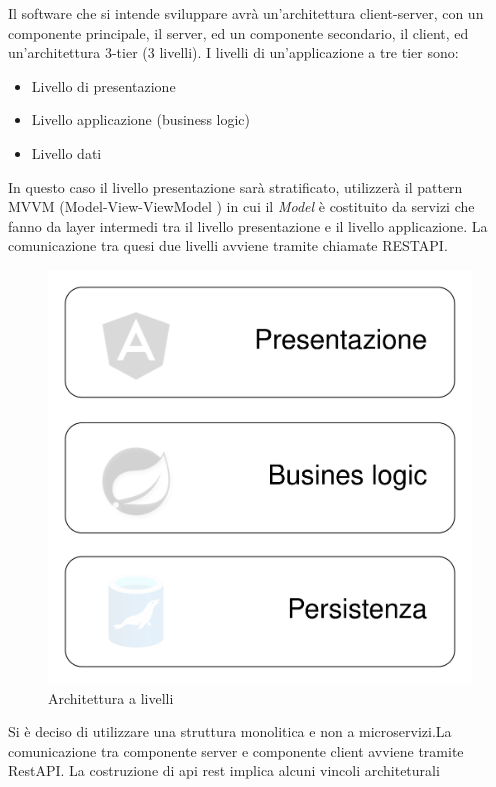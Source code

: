 \documentclass[a4paper,11pt]{article}
\begin{document}
Il software che si intende sviluppare avrà un'architettura client-server, con un componente principale, il server, ed un componente secondario, il client, ed un'architettura 3-tier (3 livelli). I livelli di un'applicazione a tre tier sono:
\begin{itemize}
  \item Livello di presentazione
  \item Livello applicazione (business logic)
  \item Livello dati
\end{itemize}

In questo caso il livello presentazione sarà stratificato, utilizzerà il pattern MVVM (Model-View-ViewModel \cite{wikipediaModelviewviewmodelWikipedia}) in cui il \textit{Model} è costituito da servizi che fanno da layer intermedi tra il livello presentazione e il livello applicazione. La comunicazione tra quesi due livelli avviene tramite chiamate RESTAPI.

\begin{figure}[H]
  \includegraphics[width=1\linewidth]{img/arch0.png}
  \caption{Architettura a livelli}
  \label{fig:architettura a livelli}
\end{figure}

Si è deciso di utilizzare una struttura monolitica e non a microservizi.La comunicazione tra componente server e componente client avviene tramite RestAPI. La costruzione di api rest implica alcuni vincoli architeturali \cite{restfulapiRESTArchitectural}
\end{document}
